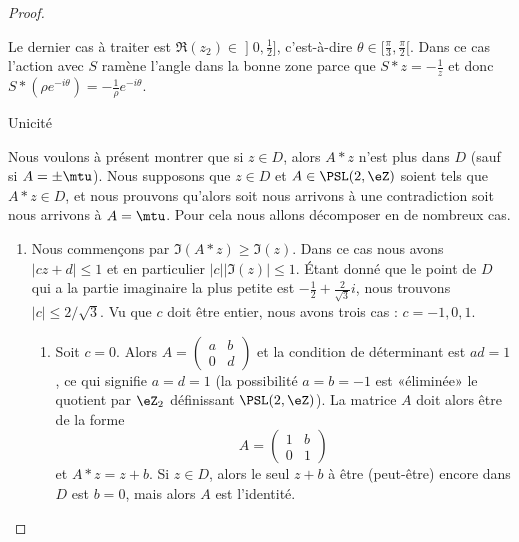 \begin{proof}
\begin{subproof}
            Le dernier cas à traiter est \( \Re(z_2)\in\mathopen] 0 , \frac{ 1 }{2} \mathclose]\), c'est-à-dire \( \theta\in \mathopen[ \frac{ \pi }{ 3 } , \frac{ \pi }{2} [\). Dans ce cas l'action avec \( S\) ramène l'angle dans la bonne zone parce que \( S*z=-\frac{1}{ z }\) et donc \( S*(\rho e^{-i\theta})=-\frac{1}{ \rho } e^{-i\theta}\).

            \item[Unicité]

                Nous voulons à présent montrer que si \( z\in D\), alors \( A*z\) n'est plus dans \( D\) (sauf si \( A=\pm\mtu\)). Nous supposons que \( z\in D\) et \( A\in \PSL(2,\eZ)\) soient tels que \( A*z\in D\), et nous prouvons qu'alors soit nous arrivons à une contradiction soit nous arrivons à \( A=\mtu\). Pour cela nous allons décomposer en de nombreux cas.

                \begin{enumerate}
                    \item
                        Nous commençons par \( \Im(A*z)\geq \Im(z)\). Dans ce cas nous avons \( | cz+d |\leq 1\) et en particulier \( | c | |\Im(z) |\leq 1\). Étant donné que le point de \( D\) qui a la partie imaginaire la plus petite est \( -\frac{ 1 }{2}+\frac{ 2 }{ \sqrt{3} }i\), nous trouvons \( | c |\leq 2/\sqrt{3}\). Vu que \( c\) doit être entier, nous avons trois cas : \( c=-1,0,1\).
                        \begin{enumerate}
                            \item
                                Soit \( c=0\). Alors \( A=\begin{pmatrix}
                                    a    &   b    \\
                                    0    &   d
                                \end{pmatrix}\) et la condition de déterminant est \( ad=1\), ce qui signifie \( a=d=1\) (la possibilité \( a=b=-1\) est «éliminée» le quotient par \( \eZ_2\) définissant \( \PSL(2,\eZ)\)). La matrice \( A\) doit alors être de la forme
                                \begin{equation}
                                    A=\begin{pmatrix}
                                        1    &   b    \\
                                        0    &   1
                                    \end{pmatrix}
                                \end{equation}
                                et \( A*z=z+b\). Si \( z\in D\), alors le seul \( z+b\) à être (peut-être) encore dans \( D\) est \( b=0\), mais alors \( A\) est l'identité.


\end{enumerate}
\end{enumerate}
\end{subproof}
\end{proof}
